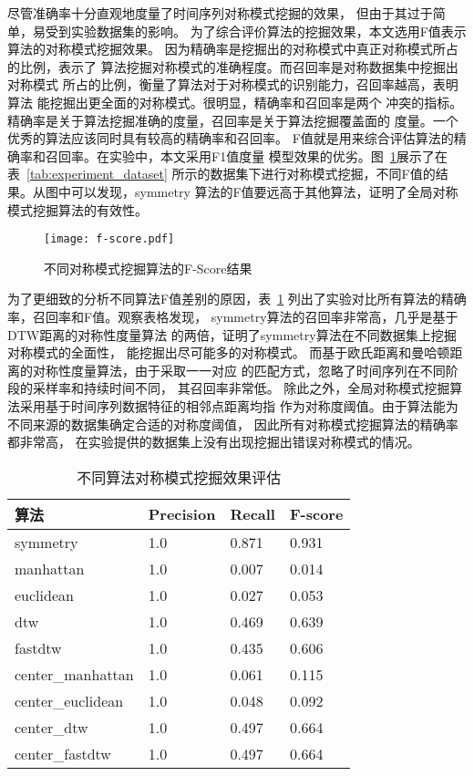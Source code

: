 尽管准确率十分直观地度量了时间序列对称模式挖掘的效果，
但由于其过于简单，易受到实验数据集的影响。
为了综合评价算法的挖掘效果，本文选用F值表示算法的对称模式挖掘效果。
因为精确率是挖掘出的对称模式中真正对称模式所占的比例，表示了
算法挖掘对称模式的准确程度。而召回率是对称数据集中挖掘出对称模式
所占的比例，衡量了算法对于对称模式的识别能力，召回率越高，表明算法
能挖掘出更全面的对称模式。很明显，精确率和召回率是两个
冲突的指标。精确率是关于算法挖掘准确的度量，召回率是关于算法挖掘覆盖面的
度量。一个优秀的算法应该同时具有较高的精确率和召回率。
F值就是用来综合评估算法的精确率和召回率。在实验中，本文采用F1值度量
模型效果的优劣。图~\ref{fig:fscore_compare}展示了在表~\ref{tab:experiment_dataset}
所示的数据集下进行对称模式挖掘，不同F值的结果。从图中可以发现，symmetry
算法的F值要远高于其他算法，证明了全局对称模式挖掘算法的有效性。
\begin{figure}
  \centering
  \texttt{[image: f-score.pdf]}
  \caption{不同对称模式挖掘算法的F-Score结果}
  \label{fig:fscore_compare}
\end{figure}

为了更细致的分析不同算法F值差别的原因，表~\ref{tab:experiment_global_algo}
列出了实验对比所有算法的精确率，召回率和F值。观察表格发现，
symmetry算法的召回率非常高，几乎是基于DTW距离的对称性度量算法
的两倍，证明了symmetry算法在不同数据集上挖掘对称模式的全面性，
能挖掘出尽可能多的对称模式。
而基于欧氏距离和曼哈顿距离的对称性度量算法，由于采取一一对应
的匹配方式，忽略了时间序列在不同阶段的采样率和持续时间不同，
其召回率非常低。
除此之外，全局对称模式挖掘算法采用基于时间序列数据特征的相邻点距离均指
作为对称度阈值。由于算法能为不同来源的数据集确定合适的对称度阈值，
因此所有对称模式挖掘算法的精确率都非常高，
在实验提供的数据集上没有出现挖掘出错误对称模式的情况。


\begin{table}
  \centering
  \caption{不同算法对称模式挖掘效果评估}
  \begin{tabular}{llll}
    \toprule
    算法              & Precision & Recall & F-score \\
    \midrule
    symmetry          & 1.0       & 0.871  & 0.931   \\
    manhattan         & 1.0       & 0.007  & 0.014   \\
    euclidean         & 1.0       & 0.027  & 0.053   \\
    dtw               & 1.0       & 0.469  & 0.639   \\
    fastdtw           & 1.0       & 0.435  & 0.606   \\
    center\_manhattan & 1.0       & 0.061  & 0.115   \\
    center\_euclidean & 1.0       & 0.048  & 0.092   \\
    center\_dtw       & 1.0       & 0.497  & 0.664   \\
    center\_fastdtw   & 1.0       & 0.497  & 0.664   \\
    \bottomrule
  \end{tabular}
  \label{tab:experiment_global_algo}
\end{table}


